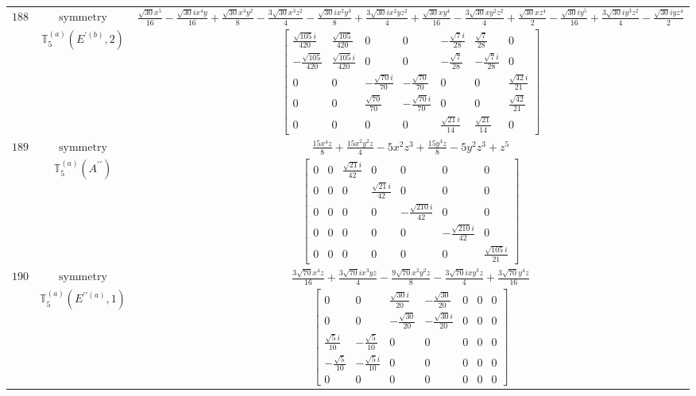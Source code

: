 \documentclass[fleqn,8pt,landscape]{jsarticle}
\begin{document}
\begin{longtable}{ccc}
$ 188 $ & $ \text{symmetry} $ & $ \frac{\sqrt{30} x^{5}}{16} - \frac{\sqrt{30} i x^{4} y}{16} + \frac{\sqrt{30} x^{3} y^{2}}{8} - \frac{3 \sqrt{30} x^{3} z^{2}}{4} - \frac{\sqrt{30} i x^{2} y^{3}}{8} + \frac{3 \sqrt{30} i x^{2} y z^{2}}{4} + \frac{\sqrt{30} x y^{4}}{16} - \frac{3 \sqrt{30} x y^{2} z^{2}}{4} + \frac{\sqrt{30} x z^{4}}{2} - \frac{\sqrt{30} i y^{5}}{16} + \frac{3 \sqrt{30} i y^{3} z^{2}}{4} - \frac{\sqrt{30} i y z^{4}}{2} $ \\
$  $ & $ \mathbb{T}_{5}^{(a)}(E^{\prime(b)},2) $ & $ \begin{bmatrix} \frac{\sqrt{105} i}{420} & \frac{\sqrt{105}}{420} & 0 & 0 & - \frac{\sqrt{7} i}{28} & \frac{\sqrt{7}}{28} & 0 \\ - \frac{\sqrt{105}}{420} & \frac{\sqrt{105} i}{420} & 0 & 0 & - \frac{\sqrt{7}}{28} & - \frac{\sqrt{7} i}{28} & 0 \\ 0 & 0 & - \frac{\sqrt{70} i}{70} & - \frac{\sqrt{70}}{70} & 0 & 0 & \frac{\sqrt{42} i}{21} \\ 0 & 0 & \frac{\sqrt{70}}{70} & - \frac{\sqrt{70} i}{70} & 0 & 0 & \frac{\sqrt{42}}{21} \\ 0 & 0 & 0 & 0 & \frac{\sqrt{21} i}{14} & \frac{\sqrt{21}}{14} & 0 \end{bmatrix} $ \\ \hline
$ 189 $ & $ \text{symmetry} $ & $ \frac{15 x^{4} z}{8} + \frac{15 x^{2} y^{2} z}{4} - 5 x^{2} z^{3} + \frac{15 y^{4} z}{8} - 5 y^{2} z^{3} + z^{5} $ \\
$  $ & $ \mathbb{T}_{5}^{(a)}(A^{\prime\prime}) $ & $ \begin{bmatrix} 0 & 0 & \frac{\sqrt{21} i}{42} & 0 & 0 & 0 & 0 \\ 0 & 0 & 0 & \frac{\sqrt{21} i}{42} & 0 & 0 & 0 \\ 0 & 0 & 0 & 0 & - \frac{\sqrt{210} i}{42} & 0 & 0 \\ 0 & 0 & 0 & 0 & 0 & - \frac{\sqrt{210} i}{42} & 0 \\ 0 & 0 & 0 & 0 & 0 & 0 & \frac{\sqrt{105} i}{21} \end{bmatrix} $ \\ \hline
$ 190 $ & $ \text{symmetry} $ & $ \frac{3 \sqrt{70} x^{4} z}{16} + \frac{3 \sqrt{70} i x^{3} y z}{4} - \frac{9 \sqrt{70} x^{2} y^{2} z}{8} - \frac{3 \sqrt{70} i x y^{3} z}{4} + \frac{3 \sqrt{70} y^{4} z}{16} $ \\
$  $ & $ \mathbb{T}_{5}^{(a)}(E^{\prime\prime(a)},1) $ & $ \begin{bmatrix} 0 & 0 & \frac{\sqrt{30} i}{20} & - \frac{\sqrt{30}}{20} & 0 & 0 & 0 \\ 0 & 0 & - \frac{\sqrt{30}}{20} & - \frac{\sqrt{30} i}{20} & 0 & 0 & 0 \\ \frac{\sqrt{5} i}{10} & - \frac{\sqrt{5}}{10} & 0 & 0 & 0 & 0 & 0 \\ - \frac{\sqrt{5}}{10} & - \frac{\sqrt{5} i}{10} & 0 & 0 & 0 & 0 & 0 \\ 0 & 0 & 0 & 0 & 0 & 0 & 0 \end{bmatrix} $ \\ \hline

\end{longtable}
\end{document}
